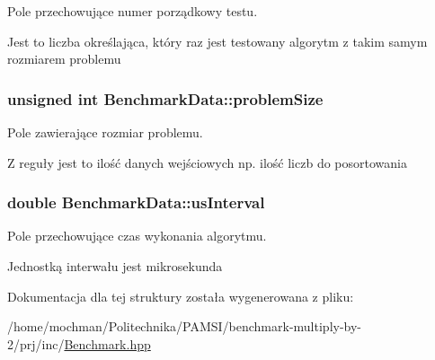 Pole przechowujące numer porządkowy testu. 

Jest to liczba określająca, który raz jest testowany algorytm z takim samym rozmiarem problemu \hypertarget{struct_benchmark_data_a0930dd7c614875360efdcea006b93ffd}{
\subsubsection[{problem\-Size}]{\setlength{\rightskip}{0pt plus 5cm}unsigned int Benchmark\-Data\-::problem\-Size}}\label{struct_benchmark_data_a0930dd7c614875360efdcea006b93ffd}


Pole zawierające rozmiar problemu. 

Z reguły jest to ilość danych wejściowych np. ilość liczb do posortowania \hypertarget{struct_benchmark_data_a4ca32898c190668bf63fd31a708199a9}{
\subsubsection[{us\-Interval}]{\setlength{\rightskip}{0pt plus 5cm}double Benchmark\-Data\-::us\-Interval}}\label{struct_benchmark_data_a4ca32898c190668bf63fd31a708199a9}


Pole przechowujące czas wykonania algorytmu. 

Jednostką interwału jest mikrosekunda 

Dokumentacja dla tej struktury została wygenerowana z pliku\-:\begin{DoxyCompactItemize}
\item 
/home/mochman/\-Politechnika/\-P\-A\-M\-S\-I/benchmark-\/multiply-\/by-\/2/prj/inc/\hyperlink{_benchmark_8hpp}{Benchmark.\-hpp}\end{DoxyCompactItemize}
